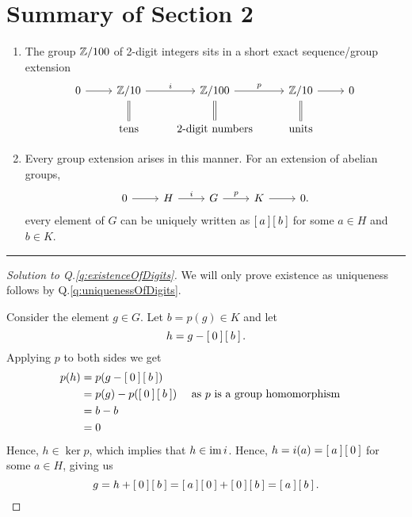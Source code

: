 \section*{Summary of Section 2}
\begin{enumerate}
  \item The group $\mathbb{Z}/100$ of 2-digit integers sits in a short exact sequence/group extension
  \begin{equation*}
    \begin{tikzcd}
      0 \ar[r] & \bbz/10 \ar[r,"i"] &  \bbz/100  \ar[r,"p"] & \bbz/10 \ar[r] & 0 \\
       & \mbox{tens} \ar[u, equal]  &  \mbox{2-digit numbers}  \ar[u,equal] & \mbox{units}  \ar[u, equal] &
    \end{tikzcd}
  \end{equation*}

  \item Every group extension arises in this manner.
  For an extension of abelian groups,
  \begin{equation*}
    \begin{tikzcd}
      0 \ar[r] & H \ar[r,"i"] &  G  \ar[r, "p"] & K \ar[r] & 0.
    \end{tikzcd}
  \end{equation*}
  every element of $G$ can be uniquely written as $\left[\: a \:\right]\left[\: b \:\right]$ for some $a \in H$ and $b \in K$.
\end{enumerate}


\vspace{2cm}
\hrule
\vspace{2cm}

\begin{proof}[Solution to Q.\ref{q:existenceOfDigits}]
  We will only prove existence as uniqueness follows by Q.\ref{q:uniquenessOfDigits}.

  Consider the element $g \in G$. Let $b = p(g) \in K$ and let \begin{equation*}
    h = g - \left[\: 0 \:\right]\left[\: b \:\right].
  \end{equation*}
  Applying $p$ to both sides we get
  \begin{align*}
    p(h)
    &= p(g - \left[\: 0 \:\right]\left[\: b \:\right]) \\
    &= p(g) - p(\left[\: 0 \:\right]\left[\: b \:\right]) && \mbox{ as $p$ is a group homomorphism}\\
    &= b -b \\
    &= 0
  \end{align*}
  Hence, $h \in \ker p$, which implies that $h \in \operatorname{im} i$.
  Hence, $ h = i(a) = \left[\: a \:\right]\left[\: 0 \:\right]$ for some $a \in H$, giving us
  \begin{equation*}
    g = h + \left[\: 0 \:\right]\left[\: b \:\right] = \left[\: a \:\right]\left[\: 0 \:\right] + \left[\: 0 \:\right]\left[\: b \:\right] = \left[\: a \:\right]\left[\: b \:\right].
  \end{equation*}
\end{proof}
